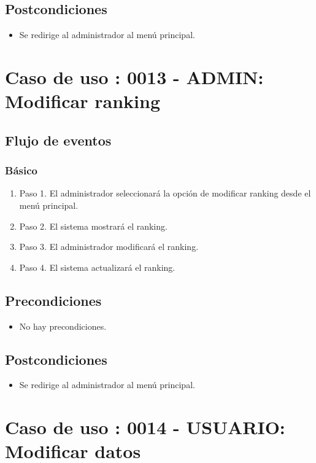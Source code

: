 \subsection{Postcondiciones}
\begin{itemize}
\item Se redirige al administrador al menú principal.
\end{itemize}



\section{Caso de uso : 0013 - ADMIN: Modificar ranking}\label{sec:uc0}
\subsection{Flujo de eventos}
\subsubsection{Básico}

\begin{enumerate}
\item Paso 1.
El administrador seleccionará la opción de modificar ranking desde el menú principal.
\item Paso 2.
El sistema mostrará el ranking.
\item Paso 3.
El administrador modificará el ranking.
\item Paso 4.
El sistema actualizará el ranking.
\end{enumerate}

\subsection{Precondiciones}
\begin{itemize}
\item No hay precondiciones.
\end{itemize}

\subsection{Postcondiciones}
\begin{itemize}
\item Se redirige al administrador al menú principal.
\end{itemize}



\section{Caso de uso : 0014 - USUARIO: Modificar datos}\label{sec:uc0}

